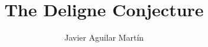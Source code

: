 \documentclass{beamer}
\title{The Deligne Conjecture}
\author{Javier Aguilar Mart\'in}
\institute{Universidad de Sevilla}
\date{}
\theoremstyle{definition}
\begin{document}
\frame{\titlepage}
%
% 
% 
% 

% 



\newcommand{\seti}{\setcounter{saveenumi}{\value{enumi}}}
\newcommand{\conti}{\setcounter{enumi}{\value{saveenumi}}}

\makeatletter
\newcommand{\xRightarrow}[2][]{\ext@arrow 0359\Rightarrowfill@{#1}{#2}}
\makeatother


%	
%




\end{document}
